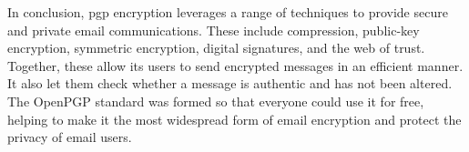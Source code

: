 In conclusion, \acrshort{pgp} encryption leverages a range of techniques to provide secure and private email communications. These include compression, public-key encryption, symmetric encryption, digital signatures, and the web of trust. Together, these allow its users to send encrypted messages in an efficient manner. It also let them check whether a message is authentic and has not been altered. The OpenPGP standard was formed so that everyone could use it for free, helping to make it the most widespread form of email encryption and protect the privacy of email users.